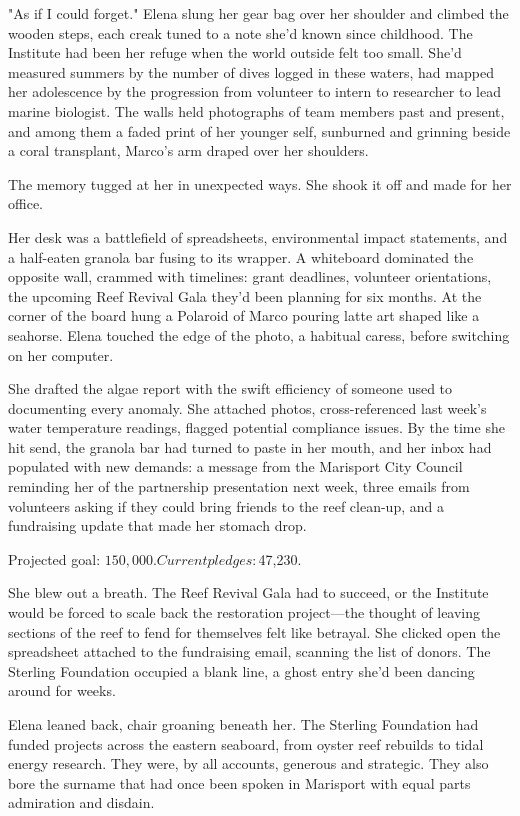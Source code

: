 "As if I could forget." Elena slung her gear bag over her shoulder and climbed the wooden steps, each creak tuned to a note she'd known since childhood. The Institute had been her refuge when the world outside felt too small. She'd measured summers by the number of dives logged in these waters, had mapped her adolescence by the progression from volunteer to intern to researcher to lead marine biologist. The walls held photographs of team members past and present, and among them a faded print of her younger self, sunburned and grinning beside a coral transplant, Marco's arm draped over her shoulders.

The memory tugged at her in unexpected ways. She shook it off and made for her office.

Her desk was a battlefield of spreadsheets, environmental impact statements, and a half-eaten granola bar fusing to its wrapper. A whiteboard dominated the opposite wall, crammed with timelines: grant deadlines, volunteer orientations, the upcoming Reef Revival Gala they'd been planning for six months. At the corner of the board hung a Polaroid of Marco pouring latte art shaped like a seahorse. Elena touched the edge of the photo, a habitual caress, before switching on her computer.

She drafted the algae report with the swift efficiency of someone used to documenting every anomaly. She attached photos, cross-referenced last week's water temperature readings, flagged potential compliance issues. By the time she hit send, the granola bar had turned to paste in her mouth, and her inbox had populated with new demands: a message from the Marisport City Council reminding her of the partnership presentation next week, three emails from volunteers asking if they could bring friends to the reef clean-up, and a fundraising update that made her stomach drop.

Projected goal: $150,000.

Current pledges: $47,230.

She blew out a breath. The Reef Revival Gala had to succeed, or the Institute would be forced to scale back the restoration project—the thought of leaving sections of the reef to fend for themselves felt like betrayal. She clicked open the spreadsheet attached to the fundraising email, scanning the list of donors. The Sterling Foundation occupied a blank line, a ghost entry she'd been dancing around for weeks.

Elena leaned back, chair groaning beneath her. The Sterling Foundation had funded projects across the eastern seaboard, from oyster reef rebuilds to tidal energy research. They were, by all accounts, generous and strategic. They also bore the surname that had once been spoken in Marisport with equal parts admiration and disdain.

